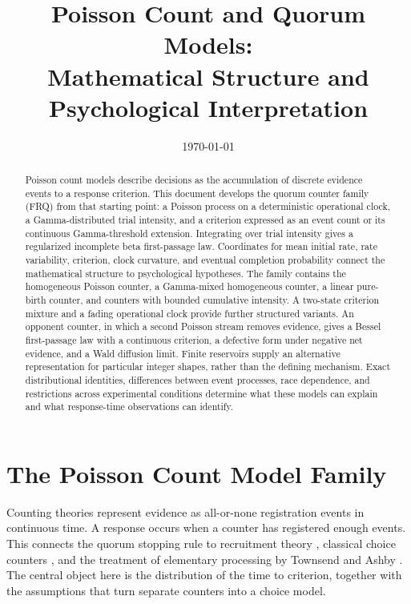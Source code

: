 \documentclass[12pt]{article}
\title{Poisson Count and Quorum Models:\\Mathematical Structure and Psychological Interpretation}
\author{}
\date{\today}
\theoremstyle{definition}
\theoremstyle{plain}
\theoremstyle{remark}
\begin{document}
\maketitle
\begin{abstract}
Poisson count models describe decisions as the accumulation of discrete evidence events to a response criterion. This document develops the quorum counter family (FRQ) from that starting point: a Poisson process on a deterministic operational clock, a Gamma-distributed trial intensity, and a criterion expressed as an event count or its continuous Gamma-threshold extension. Integrating over trial intensity gives a regularized incomplete beta first-passage law. Coordinates for mean initial rate, rate variability, criterion, clock curvature, and eventual completion probability connect the mathematical structure to psychological hypotheses. The family contains the homogeneous Poisson counter, a Gamma-mixed homogeneous counter, a linear pure-birth counter, and counters with bounded cumulative intensity. A two-state criterion mixture and a fading operational clock provide further structured variants. An opponent counter, in which a second Poisson stream removes evidence, gives a Bessel first-passage law with a continuous criterion, a defective form under negative net evidence, and a Wald diffusion limit. Finite reservoirs supply an alternative representation for particular integer shapes, rather than the defining mechanism. Exact distributional identities, differences between event processes, race dependence, and restrictions across experimental conditions determine what these models can explain and what response-time observations can identify.
\end{abstract}
\tableofcontents
\newpage

\section{The Poisson Count Model Family}\label{sec:poisson}

Counting theories represent evidence as all-or-none registration events in continuous time. A response occurs when a counter has registered enough events. This connects the quorum stopping rule to recruitment theory \cite{LaBerge1962}, classical choice counters \cite{Pike1966,Pike1973}, and the treatment of elementary processing by Townsend and Ashby \cite{TownsendAshby1983}. The central object here is the distribution of the time to criterion, together with the assumptions that turn separate counters into a choice model.
\end{document}
